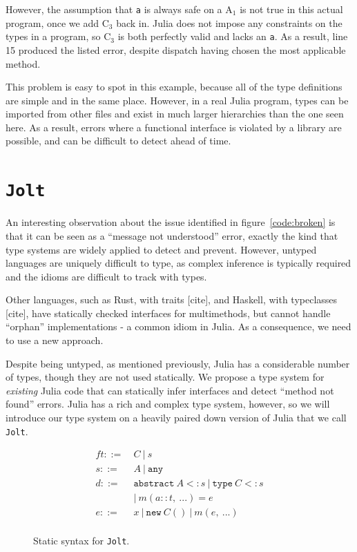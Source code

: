 \documentclass[preprint]{sigplanconf}
\newcommand{\xt}[1]{\texttt{#1}}
\newcommand{\abstype}[2]{\xt{abstract}~#1 <: #2}
\newcommand{\oftype}[2]{#1::#2}
\newcommand{\m}[2]{{#1}(#2)}
\newcommand{\contype}[2]{\xt{type}~#1 <: #2}
\newcommand{\any}{\xt{any}}
\newcommand{\jolt}{\xt{Jolt}}
\renewcommand{\ldots}{...}
\newcommand{\cnum}[2]{$\text{#1}_#2$}
\begin{document}
However, the assumption that \xt{a} is always safe on a \cnum{A}{1} is not true
in this actual program, once we add \cnum{C}{3} back in. Julia does not impose
any constraints on the types in a program, so \cnum{C}{3} is both perfectly valid
and lacks an \xt{a}. As a result, line 15 produced the listed error, despite 
dispatch having chosen the most applicable method.

This problem is easy to spot in this example, because all of the type definitions
are simple and in the same place. However, in a real Julia program, types can be
imported from other files and exist in much larger hierarchies than the one seen
here. As a result, errors where a functional interface is violated by a library
are possible, and can be difficult to detect ahead of time.

\section{\jolt}
An interesting observation about the issue identified in figure~\ref{code:broken}
is that it can be seen as a ``message not understood'' error, exactly the kind
that type systems are widely applied to detect and prevent. However, untyped 
languages are uniquely difficult to type, as complex inference is typically
required and the idioms are difficult to track with types.

Other languages, such as Rust, with traits [cite], and Haskell, with 
typeclasses [cite], have statically checked interfaces for multimethods, but 
cannot handle ``orphan'' implementations - a common idiom in Julia. As a 
consequence, we need to use a new approach.

Despite being untyped, as mentioned previously, Julia has a considerable
number of types, though they are not used statically. We propose a type system
for \emph{existing} Julia code that can statically infer interfaces and detect
``method not found'' errors. Julia has a rich and complex type system, however,
so we will introduce our type system on a heavily paired down version of Julia 
that we call \jolt.

\begin{figure}
\begin{align*}f
t ::=~&  C ~|~ s\\
s ::=~& A ~|~ \any\\
d ::=~& \abstype{A}{s} ~|~ \contype{C}{s} \\
  & |~ \m{m}{\oftype{a}{t}, ~\ldots} = e\\
e ::=~& x ~|~ \xt{new} ~ C() ~|~ m(e,~\ldots) \\
\end{align*}
\caption{Static syntax for \jolt.}
\label{fm:syntax}
\end{figure}
\end{document}
